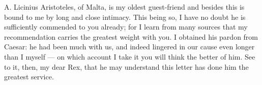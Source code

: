 

A. Licinius Aristoteles, of Malta, is my oldest guest-friend and besides this is bound to me by long and close intimacy. This being so, I have no doubt he is sufficiently commended to you already; for I learn from many sources that my recommendation carries the greatest weight with you. I obtained his pardon from Caesar: he had been much with us, and indeed lingered in our cause even longer than I myself --- on which account I take it you will think the better of him. See to it, then, my dear Rex, that he may understand this letter has done him the greatest service.
